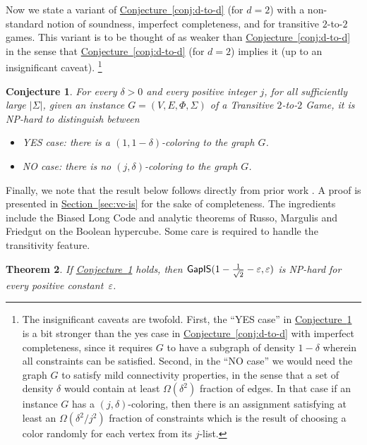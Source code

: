 \documentclass[11pt]{article}
\numberwithin{equation}{section}
\newtheorem{theorem}{Theorem}[section]
\theoremstyle{definition}
\theoremstyle{plain}
\newcommand{\expref}[2]{\hyperref[#2]{#1~\ref{#2}}}
\newtheorem{rconj}[theorem]{Conjecture}
\newcommand\eps{\varepsilon}
\begin{document}
Now we state a variant of \expref{Conjecture}{conj:d-to-d} (for $d=2$) with a non-standard notion of soundness, imperfect
completeness, and for transitive $2$-to-$2$ games. This variant is to be thought of as weaker than \expref{Conjecture}{conj:d-to-d}
in the sense that \expref{Conjecture}{conj:d-to-d} (for $d=2$) implies it (up to an insignificant caveat).
\footnote{
The insignificant caveats are twofold. First, the
%
``YES case'' %
in \expref{Conjecture}{conj:j-delta} is a bit stronger
than the yes case in \expref{Conjecture}{conj:d-to-d} with imperfect completeness, since it requires $G$ to have a subgraph
of density $1-\delta$ wherein all constraints can be satisfied. Second, in the ``NO case'' we would need the graph $G$
to satisfy mild connectivity properties, in the sense that a set of density $\delta$ would contain at least
$\Omega(\delta^2)$ fraction of edges. In that case if an instance $G$ has a $(j,\delta)$-coloring, then there is an assignment satisfying at least
%
an $\Omega(\delta^2/j^2)$ fraction  %
of constraints which is the result of choosing a color
randomly for each vertex from its $j$-list.}
\begin{rconj}\label{conj:j-delta}
%
%
%
%
%
For every $\delta>0$ and every positive integer $j$,
for all sufficiently large $|\Sigma|$,  %
given an instance $G=(V,E,\Phi,\Sigma)$ of a Transitive $2$-to-$2$ Game,
it is NP-hard to distinguish between
\begin{itemize}
\item YES case: there is a  $(1,1-\delta)$-coloring to the graph $G$.
\item NO case: there is no $(j,\delta)$-coloring to the graph $G$.
\end{itemize}
\end{rconj}

Finally, we note that the result below follows directly from prior
%
work  %
\cite{DS05, Khot02, KR08}.
A proof is presented in \expref{Section}{sec:vc-is} for the sake of completeness.
%
The ingredients include the Biased Long Code
and analytic theorems of Russo, Margulis and Friedgut on the Boolean hypercube.
Some care is required to handle the transitivity feature.

\begin{theorem}\label{thm:j-delta-vc}
If \expref{Conjecture}{conj:j-delta} holds, then
${\sf GapIS}(1-\frac{1}{\sqrt{2}}-\eps, \eps)$ is NP-hard for every positive
constant~$\eps$.  %
%
\end{theorem}
\end{document}
